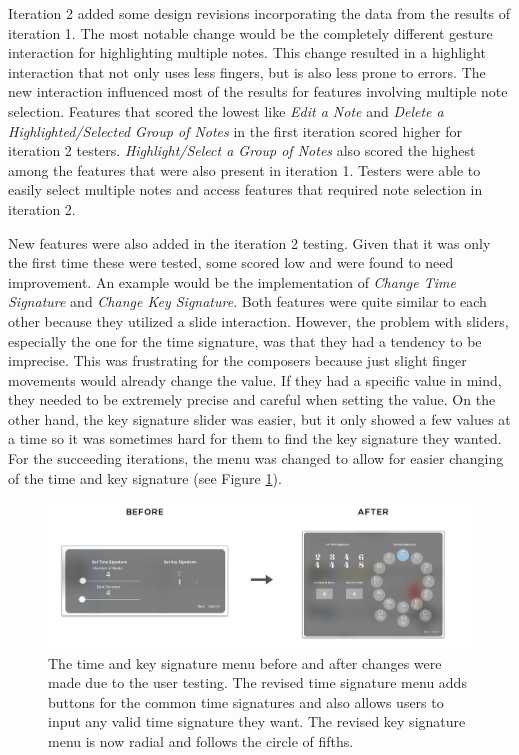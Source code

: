 			Iteration 2 added some design revisions incorporating the data from the results of iteration 1. The most notable change would be the completely different gesture interaction for highlighting multiple notes. This change resulted in a highlight interaction that not only uses less fingers, but is also less prone to errors. The new interaction influenced most of the results for features involving multiple note selection. Features that scored the lowest like \textit{Edit a Note} and \textit{Delete a Highlighted/Selected Group of Notes} in the first iteration scored higher for iteration 2 testers. \textit{Highlight/Select a Group of Notes} also scored the highest among the features that were also present in iteration 1. Testers were able to easily select multiple notes and access features that required note selection in iteration 2. 

			New features were also added in the iteration 2 testing. Given that it was only the first time these were tested, some scored low and were found to need improvement. An example would be the implementation of \textit{Change Time Signature} and \textit{Change Key Signature}. Both features were quite similar to each other because they utilized a slide interaction. However, the problem with sliders, especially the one for the time signature, was that they had a tendency to be imprecise. This was frustrating for the composers because just slight finger movements would already change the value. If they had a specific value in mind, they needed to be extremely precise and careful when setting the value. On the other hand, the key signature slider was easier, but it only showed a few values at a time so it was sometimes hard for them to find the key signature they wanted. For the succeeding iterations, the menu was changed to allow for easier changing of the time and key signature (see Figure \ref{fig:time-key-signature}).

			\begin{figure}[H]
				\centering
				\includegraphics[scale=0.25]{figures/before-after-tsmenu}
			    \caption{The time and key signature menu before and after changes were made due to the user testing. The revised time signature menu adds buttons for the common time signatures and also allows users to input any valid time signature they want. The revised key signature menu is now radial and follows the circle of fifths.}
			    \label{fig:time-key-signature}
			\end{figure} 

